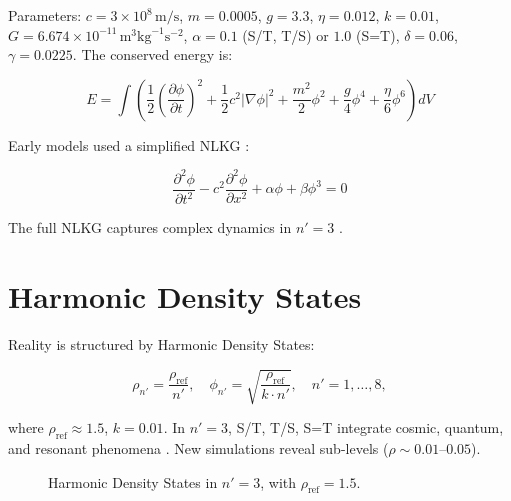 \documentclass[11pt]{article}
\begin{document}
Parameters: \(c = 3 \times 10^8 \, \text{m/s}\), \(m = 0.0005\), \(g = 3.3\), \(\eta = 0.012\), \(k = 0.01\), \(G = 6.674 \times 10^{-11} \, \text{m}^3 \text{kg}^{-1} \text{s}^{-2}\), \(\alpha = 0.1\) (S/T, T/S) or \(1.0\) (S=T), \(\delta = 0.06\), \(\gamma = 0.0225\). The conserved energy is:

\begin{equation}
E = \int \left( \frac{1}{2} \left( \frac{\partial \phi}{\partial t} \right)^2 + \frac{1}{2} c^2 |\nabla \phi|^2 + \frac{m^2}{2} \phi^2 + \frac{g}{4} \phi^4 + \frac{\eta}{6} \phi^6 \right) dV
\label{eq:energy}
\end{equation}

Early models used a simplified NLKG \citep{emvula2025rst}:

\begin{equation}
\frac{\partial^2 \phi}{\partial t^2} - c^2 \frac{\partial^2 \phi}{\partial x^2} + \alpha \phi + \beta \phi^3 = 0
\label{eq:nlkg_early}
\end{equation}

The full NLKG captures complex dynamics in \(n' = 3\) \citep{emvula2025compendium}.

\section{Harmonic Density States}
Reality is structured by Harmonic Density States:

\begin{equation}
\rho_{n'} = \frac{\rho_{\text{ref}}}{n'}, \quad \phi_{n'} = \sqrt{\frac{\rho_{\text{ref}}}{k \cdot n'}}, \quad n' = 1, \ldots, 8,
\label{eq:density}
\end{equation}

where \(\rho_{\text{ref}} \approx 1.5\), \(k = 0.01\). In \(n' = 3\), S/T, T/S, S=T integrate cosmic, quantum, and resonant phenomena \citep{emvula2025compendium}. New simulations reveal sub-levels (\(\rho \sim 0.01–0.05\)).

\begin{figure}[htbp]
\centering
{}
\caption{Harmonic Density States in \(n' = 3\), with \(\rho_{\text{ref}} = 1.5\).}
\label{fig:density_states}
\end{figure}
\end{document}
